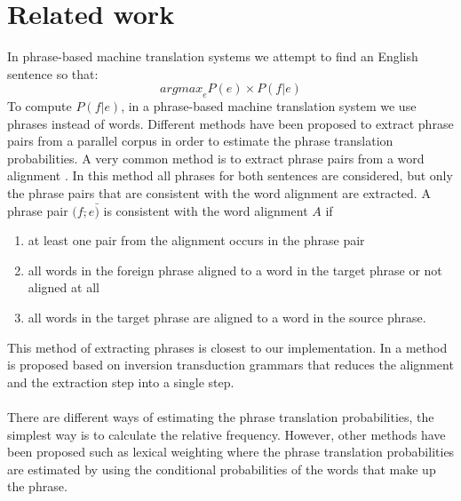 \documentclass[11pt]{article}
\begin{document}

\section{Related work}
In phrase-based machine translation systems we attempt to find an English sentence so that: 
$$\textit{argmax}_e P(e) \times P(f|e)$$
To compute $P(f|e)$, in a phrase-based machine translation system we use phrases instead of words. Different methods have been proposed to extract phrase pairs from a parallel corpus in order to estimate the phrase translation probabilities. A very common method is to extract phrase pairs from a word alignment \cite{koehn}\cite{theother}. In this method all phrases for both sentences are considered, but only the phrase pairs that are consistent with the word alignment are extracted. A phrase pair $(f\bar, e\bar)$ is consistent with the word alignment $A$ if
\begin{enumerate}
\item at least one pair from the alignment occurs in the phrase pair
\item all words in the foreign phrase aligned to a word in the target phrase or not aligned at all
\item all words in the target phrase are aligned to a word in the source phrase.
\end{enumerate} 
This method of extracting phrases is closest to our implementation. In \cite{super} a method is proposed based on inversion transduction grammars that reduces the alignment and the extraction step into a single step. \\\\
There are different ways of estimating the phrase translation probabilities, the simplest way is to calculate the relative frequency. However, other methods have been proposed such as lexical weighting \cite{lexical} where the phrase translation probabilities are estimated by using the conditional probabilities of the words that make up the phrase.
\end{document}
